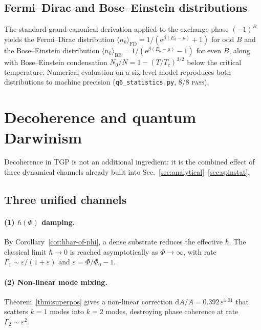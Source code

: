 \documentclass[11pt,a4paper]{article}
\renewcommand{\Phi}{\varPhi}
\newcommand{\PhiZero}{\varPhi_{0}}
\newcommand{\Nwind}{B}
\newcommand{\eps}{\varepsilon}
\begin{document}
\subsection{Fermi--Dirac and Bose--Einstein distributions}

The standard grand-canonical derivation applied to the exchange phase
$(-1)^{\Nwind}$ yields the Fermi--Dirac distribution
$\langle n_{k}\rangle_{\mathrm{FD}}=1/(\mathrm{e}^{\beta(E_{k}-\mu)}+1)$
for odd $\Nwind$ and the Bose--Einstein distribution
$\langle n_{k}\rangle_{\mathrm{BE}}=1/(\mathrm{e}^{\beta(E_{k}-\mu)}-1)$
for even $\Nwind$, along with Bose--Einstein condensation
$N_{0}/N=1-(T/T_{c})^{3/2}$ below the critical temperature.
Numerical evaluation on a six-level model reproduces both
distributions to machine precision
(\verb|q6_statistics.py|, 8/8 \textsc{pass}).

\section{Decoherence and quantum Darwinism}\label{sec:decoherence}

Decoherence in TGP is not an additional ingredient: it is the
combined effect of three dynamical channels already built into
Sec.~\ref{sec:analytical}--\ref{sec:spinstat}.

\subsection{Three unified channels}

\paragraph{(1) $\hbar(\Phi)$ damping.}
By Corollary~\ref{cor:hbar-of-phi}, a dense substrate reduces the
effective $\hbar$. The classical limit $\hbar\to 0$ is reached
asymptotically as $\Phi\to\infty$, with rate
$\Gamma_{1}\sim\eps/(1+\eps)$ and
$\eps=\Phi/\PhiZero - 1$.

\paragraph{(2) Non-linear mode mixing.}
Theorem~\ref{thm:superpos} gives a non-linear correction
$\mathrm{d}A/A=0.392\,\eps^{1.01}$ that scatters $k=1$ modes into
$k=2$ modes, destroying phase coherence at rate
$\Gamma_{2}\sim\eps^{2}$.
\end{document}

